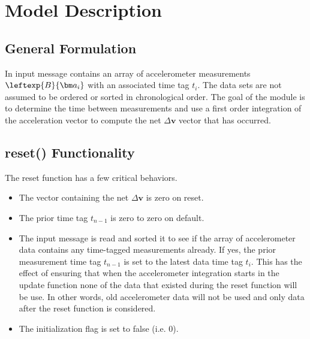 



\section{Model Description}
\subsection{General Formulation}
In input message contains an array of accelerometer measurements $\leftexp{B}{\bm a_{i}}$ with an associated time tag $t_{i}$.  The data sets are not assumed to be ordered or sorted in chronological order.  The goal of the module is to determine the time between measurements and use a first order integration of the acceleration vector to compute the net $\Delta\bm v$ vector that has occurred.


\subsection{reset() Functionality}
The reset function has a few critical behaviors.
\begin{itemize}
	\item The vector containing the net $\Delta \bm v$ is zero on reset.
	\item The prior time tag $t_{n-1}$ is zero to zero on default.
	\item The input message is read and sorted it to see if the array of accelerometer data contains any time-tagged measurements already.  If yes, the prior measurement time tag $t_{n-1}$ is set to the latest data time tag $t_{i}$.  This has the effect of ensuring that when the accelerometer integration starts in the update function none of the data that existed during the reset function will be use.  In other words, old accelerometer data will not be used and only data after the reset function is considered.
	\item The initialization flag is set to false (i.e. 0).
\end{itemize}


